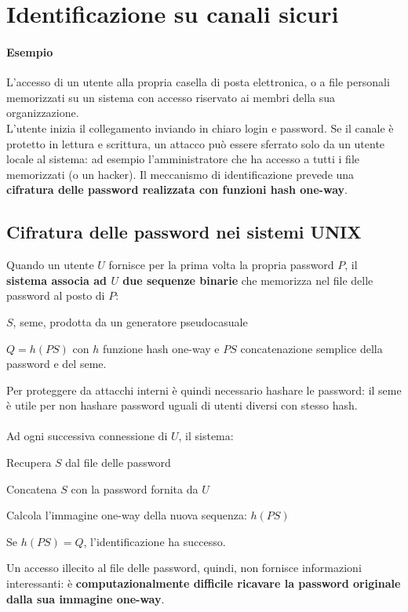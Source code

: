 \documentclass[10pt]{book}
\begin{document}
\section{Identificazione su canali sicuri}
\paragraph{Esempio} L'accesso di un utente alla propria casella di posta elettronica, o a file personali memorizzati su un sistema con accesso riservato ai membri della sua organizzazione.\\L'utente inizia il collegamento inviando in chiaro login e password. Se il canale è protetto in lettura e scrittura, un attacco può essere sferrato solo da un utente locale al sistema: ad esempio l'amministratore che ha accesso a tutti i file memorizzati (o un hacker).
Il meccanismo di identificazione prevede una \textbf{cifratura delle password realizzata con funzioni hash one-way}.

\subsection{Cifratura delle password nei sistemi UNIX}
Quando un utente $U$ fornisce per la prima volta la propria password $P$, il \textbf{sistema associa ad $U$ due sequenze binarie} che memorizza nel file delle password al posto di $P$:
\begin{list}{}{}
	\item $S$, seme, prodotta da un generatore pseudocasuale
	\item $Q = h(PS)$ con $h$ funzione hash one-way e $PS$ concatenazione semplice della password e del seme.
\end{list}
Per proteggere da attacchi interni è quindi necessario hashare le password: il seme è utile per non hashare password uguali di utenti diversi con stesso hash.\\\\
Ad ogni successiva connessione di $U$, il sistema:
\begin{list}{}{}
	\item Recupera $S$ dal file delle password
	\item Concatena $S$ con la password fornita da $U$
	\item Calcola l'immagine one-way della nuova sequenza: $h(PS)$
	\item Se $h(PS) = Q$, l'identificazione ha successo.
\end{list}
Un accesso illecito al file delle password, quindi, non fornisce informazioni interessanti: è \textbf{computazionalmente difficile ricavare la password originale dalla sua immagine one-way}.
\end{document}
